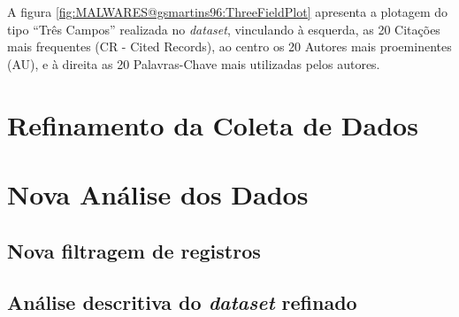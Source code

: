 A figura \ref{fig:MALWARES@gsmartins96:ThreeFieldPlot} apresenta a plotagem do tipo ``Três Campos'' realizada no \textit{dataset}, vinculando à esquerda, as 20 Citações mais frequentes (CR - Cited Records), ao centro os 20 Autores mais proeminentes (AU), e à direita as 20 Palavras-Chave mais utilizadas pelos autores.

\section{Refinamento da Coleta de Dados}

\section{Nova Análise dos Dados}

\subsection{Nova filtragem de registros}

\subsection{Análise descritiva do \textit{dataset} refinado}
